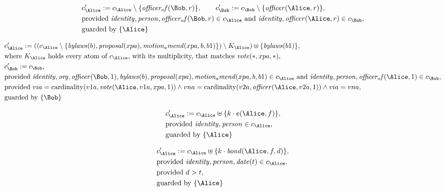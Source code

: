 \begin{align*}
&
c'_
{
\Alice
}
 := 
c_
{
\Alice
}
 \setminus 
\{
\mathit{
officer_of
}
(
\Bob
,
r
)
\}
, \qquad 
c'_
{
\Bob
}
 := 
c_
{
\Bob
}
 \setminus 
\{
\mathit{
officer
}
(
\Alice
,
r
)
\}
,\\
&
\text{provided } 
\mathit{
identity
}
,
\mathit{
person
}
,
\mathit{
officer_of
}
(
\Bob
,
r
)
 \in c_
{
\Alice
}
 \text{ and } 
\mathit{
identity
}
,
\mathit{
officer
}
(
\Alice
,
r
)
 \in c_
{
\Bob
}
,\\
&
\text{guarded by } \{
\Alice
\}
\end{align*}

\begin{align*}
&
c'_
{
\Alice
}
 := 
(
(c_
{
\Alice
}
 \setminus 
\{
\mathit{
bylaws
}
(
b
)
,
\mathit{
proposal
}
(
xpa
)
,
\mathit{
motion_amend
}
(
xpa
,
b
,
b1
)
\}
) \setminus K_
{
\Alice
}
) \uplus 
\{
\mathit{
bylaws
}
(
b1
)
\}
,\\
&
\text{where } K_
{
\Alice
}
 \text{ holds every atom of } c_
{
\Alice
}
 \text{, with its multiplicity, that matches } 
\mathit{
vote
}
(
\ast
,
xpa
,
\ast
)
,\\
&
c'_
{
\Bob
}
 := 
c_
{
\Bob
}
,\\
&
\text{provided } 
\mathit{
identity
}
,
\mathit{
org
}
,
\mathit{
officer
}
(
\Bob
,
1
)
,
\mathit{
bylaws
}
(
b
)
,
\mathit{
proposal
}
(
xpa
)
,
\mathit{
motion_amend
}
(
xpa
,
b
,
b1
)
 \in c_
{
\Alice
}
 \text{ and } 
\mathit{
identity
}
,
\mathit{
person
}
,
\mathit{
officer_of
}
(
\Alice
,
1
)
 \in c_
{
\Bob
}
,\\
&
\text{provided } 
via
=
\mathrm{cardinality}(
v1a
,
\mathit{
vote
}
(
\Alice
,
v1a
,
xpa
,
1
)
)
\land
vna
=
\mathrm{cardinality}(
v2a
,
\mathit{
officer
}
(
\Alice
,
v2a
,
1
)
)
\land
via
=
vna
,\\
&
\text{guarded by } \{
\Bob
\}
\end{align*}

\begin{align*}
&
c'_
{
\Alice
}
 := 
c_
{
\Alice
}
 \uplus 
\{
k
\cdot
\text{\textcent}
(
\Alice
,
f
)
\}
,\\
&
\text{provided } 
\mathit{
identity
}
,
\mathit{
person
}
 \in c_
{
\Alice
}
,\\
&
\text{guarded by } \{
\Alice
\}
\end{align*}

\begin{align*}
&
c'_
{
\Alice
}
 := 
c_
{
\Alice
}
 \uplus 
\{
k
\cdot
\mathit{
bond
}
(
\Alice
,
f
,
d
)
\}
,\\
&
\text{provided } 
\mathit{
identity
}
,
\mathit{
person
}
,
\mathit{
date
}
(
t
)
 \in c_
{
\Alice
}
,\\
&
\text{provided } 
d
>
t
,\\
&
\text{guarded by } \{
\Alice
\}
\end{align*}
